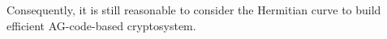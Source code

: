 \documentclass[a4paper]{article}
\theoremstyle{definition}
\newtheorem{definition}[thm]{Definition}
\theoremstyle{remark}
\newcommand{\calC}{\mathcal{C}}
\newcommand{\fqm}{\mathbb{F}_{q^m}}
\newcommand{\fq}{\mathbb{F}_{q}}
\newcommand\jade[1]{\textcolor{purple}{#1}}
\newcommand\TODO[1]{\textcolor{red}{TO DO: #1}}
\begin{document}
Consequently, it is still reasonable to consider the Hermitian curve to build efficient AG-code-based cryptosystem.



%
%
%
%
%
%
%
%
%
%
%
%
%
\end{document}
